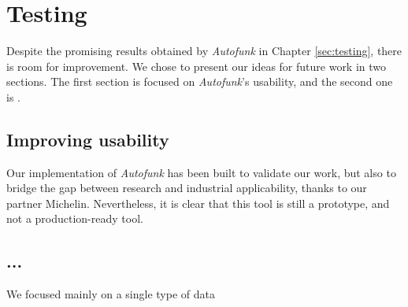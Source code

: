 \section{Testing}
\label{sec:conclusion:testing}

Despite the promising results obtained by \textit{Autofunk} in
Chapter \ref{sec:testing}, there is room for improvement. We
chose to present our ideas for future work in two sections. The
first section is focused on \textit{Autofunk}'s usability, and
the second one is .

\subsection{Improving usability}

Our implementation of \textit{Autofunk} has been built to
validate our work, but also to bridge the gap between research
and industrial applicability, thanks to our partner Michelin.
Nevertheless, it is clear that this tool is still a prototype,
and not a production-ready tool.

\TODO{}

\subsection{...}

We focused mainly on a single type of data
